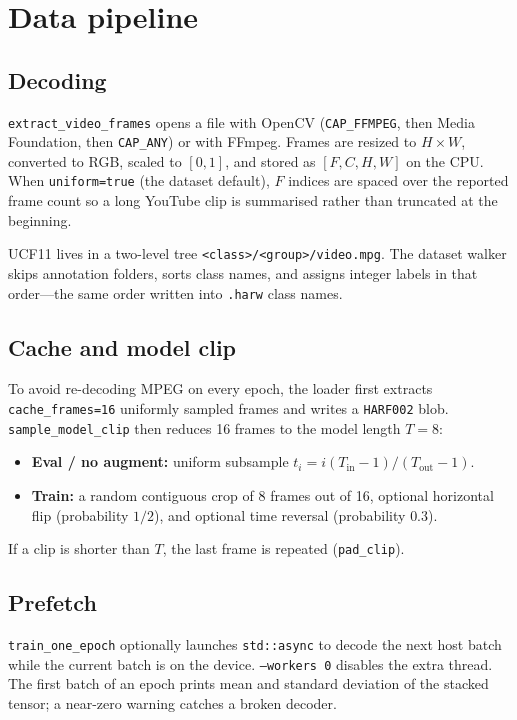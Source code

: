 \documentclass[11pt,a4paper]{article}
\begin{document}
\section{Data pipeline}
\label{sec:data}

\subsection{Decoding}

\texttt{extract\_video\_frames} opens a file with OpenCV
(\texttt{CAP\_FFMPEG}, then Media Foundation, then \texttt{CAP\_ANY}) or
with FFmpeg.
Frames are resized to $H\times W$, converted to RGB, scaled to
$[0,1]$, and stored as $[F,C,H,W]$ on the CPU.
When \texttt{uniform=true} (the dataset default), $F$ indices are spaced
over the reported frame count so a long YouTube clip is summarised rather
than truncated at the beginning.

UCF11 lives in a two-level tree
\texttt{<class>/<group>/video.mpg}.
The dataset walker skips annotation folders, sorts class names, and
assigns integer labels in that order---the same order written into
\texttt{.harw} class names.

\subsection{Cache and model clip}

To avoid re-decoding MPEG on every epoch, the loader first extracts
\texttt{cache\_frames=16} uniformly sampled frames and writes a
\texttt{HARF002} blob.
\texttt{sample\_model\_clip} then reduces 16 frames to the model length
$T=8$:
\begin{itemize}
  \item \textbf{Eval / no augment:} uniform subsample
        $t_i = i(T_{\mathrm{in}}-1)/(T_{\mathrm{out}}-1)$.
  \item \textbf{Train:} a random contiguous crop of 8 frames out of 16,
        optional horizontal flip (probability $1/2$), and optional time
        reversal (probability $0.3$).
\end{itemize}
If a clip is shorter than $T$, the last frame is repeated
(\texttt{pad\_clip}).

\subsection{Prefetch}

\texttt{train\_one\_epoch} optionally launches
\texttt{std::async} to decode the next host batch while the current batch
is on the device.
\texttt{--workers 0} disables the extra thread.
The first batch of an epoch prints mean and standard deviation of the
stacked tensor; a near-zero warning catches a broken decoder.
\end{document}
